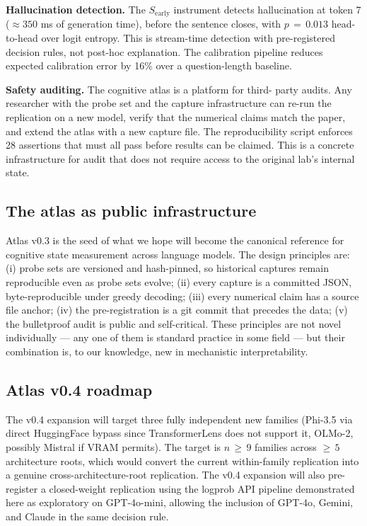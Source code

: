 \documentclass[11pt,letterpaper]{article}
\begin{document}
\textbf{Hallucination detection.} The $S_{\text{early}}$ instrument
detects hallucination at token 7 ($\approx 350$ ms of generation time),
before the sentence closes, with $p\,=\,0.013$ head-to-head over logit
entropy. This is stream-time detection with pre-registered decision rules,
not post-hoc explanation. The calibration pipeline reduces expected
calibration error by 16\% over a question-length baseline.

\textbf{Safety auditing.} The cognitive atlas is a platform for third-
party audits. Any researcher with the probe set and the capture
infrastructure can re-run the replication on a new model, verify that
the numerical claims match the paper, and extend the atlas with a new
capture file. The reproducibility script enforces 28 assertions that
must all pass before results can be claimed. This is a concrete
infrastructure for audit that does not require access to the original
lab's internal state.

\subsection{The atlas as public infrastructure}

Atlas v0.3 is the seed of what we hope will become the canonical reference
for cognitive state measurement across language models. The design
principles are: (i) probe sets are versioned and hash-pinned, so historical
captures remain reproducible even as probe sets evolve; (ii) every capture
is a committed JSON, byte-reproducible under greedy decoding; (iii) every
numerical claim has a source file anchor; (iv) the pre-registration is a
git commit that precedes the data; (v) the bulletproof audit is public
and self-critical. These principles are not novel individually --- any
one of them is standard practice in some field --- but their combination
is, to our knowledge, new in mechanistic interpretability.

\subsection{Atlas v0.4 roadmap}

The v0.4 expansion will target three fully independent new families
(Phi-3.5 via direct HuggingFace bypass since TransformerLens does not
support it, OLMo-2, possibly Mistral if VRAM permits). The target is
$n\,\geq\,9$ families across $\geq\,5$ architecture roots, which would
convert the current within-family replication into a genuine
cross-architecture-root replication. The v0.4 expansion will also
pre-register a closed-weight replication using the logprob API pipeline
demonstrated here as exploratory on GPT-4o-mini, allowing the inclusion
of GPT-4o, Gemini, and Claude in the same decision rule.
\end{document}
